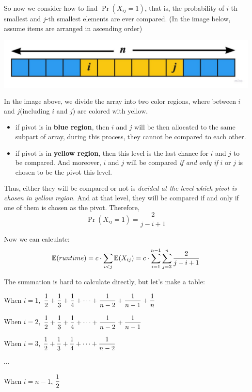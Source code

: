 \documentclass[11pt, a4paper]{COMP3711}
\begin{document}
\begin{spacing}{1.5}
    So now we consider how to find $\Pr(X_{ij}=1)$, that is, 
    the probability of $i$-th smallest and $j$-th smallest 
    elements are ever compared. 
    (In the image below, assume items are arranged in 
    ascending order)
    \begin{center}
        \includegraphics[scale=0.3]{images/03-quicksort-exp.pdf}
    \end{center}
    In the image above, we divide the array into two color regions,
    where between $i$ and $j$(including $i$ and $j$) are colored 
    with yellow.
    \begin{itemize}
        \item if pivot is in {\bf blue region}, then $i$ and $j$
        will be then allocated to the same subpart of array,
        during this process, they cannot be compared to each other.
        \item if pivot is in {\bf yellow region}, then this 
        level is the last chance for $i$ and $j$ to be compared.
        And moreover, $i$ and $j$ will be compared {\it if and 
        only if} $i$ or $j$ is chosen to be the pivot this level.
    \end{itemize}
    Thus, either they will be compared or not is {\it decided 
    at the level which pivot is chosen in yellow region}.
    And at that level, they will be compared if and only if 
    one of them is chosen as the pivot. Therefore,
    $$\Pr(X_{ij}=1)=\frac{2}{j-i+1}$$

    Now we can calculate:
    $$\mathbb{E}(runtime)=c\cdot \sum_{i<j}\mathbb{E}(X_{ij})=c\cdot 
    \sum_{i=1}^{n-1}\sum_{j=2}^{n} \frac{2}{j-i+1}$$

    The summation is hard to calculate directly, but let's make a table: 

    When $i=1$, $\displaystyle \frac{1}{2}+\frac{1}{3}+\frac{1}{4}+
    \cdots+\frac{1}{n-2}+\frac{1}{n-1}+\frac{1}{n}$

    When $i=2$, $\displaystyle \frac{1}{2}+\frac{1}{3}+\frac{1}{4}+
    \cdots+\frac{1}{n-2}+\frac{1}{n-1}$

    When $i=3$, $\displaystyle \frac{1}{2}+\frac{1}{3}+\frac{1}{4}+
    \cdots+\frac{1}{n-2}$

    $\cdots$

    When $i=n-1$, $\displaystyle \frac{1}{2}$


\end{spacing}
\end{document}
